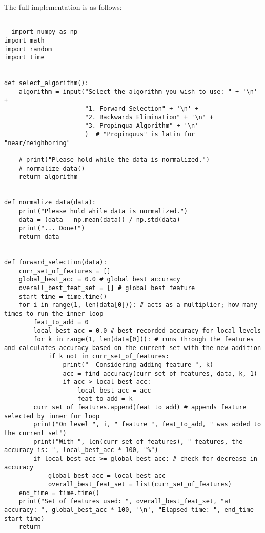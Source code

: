 \documentclass{article}
\begin{document}
\begin{lstlisting}[captionpos=b, caption=Traceback, label=listing:sparql_getallindividuals,
   basicstyle=\ttfamily]
  \end{lstlisting}


The full implementation is as follows:
\begin{lstlisting}[captionpos=b, caption=Impementation, label=listing:sparql_getallindividuals,
   basicstyle=\ttfamily]

  import numpy as np
import math
import random
import time


def select_algorithm():
    algorithm = input("Select the algorithm you wish to use: " + '\n' +
                      "1. Forward Selection" + '\n' +
                      "2. Backwards Elimination" + '\n' +
                      "3. Propinqua Algorithm" + '\n'
                      )  # "Propinquus" is latin for "near/neighboring"

    # print("Please hold while the data is normalized.")
    # normalize_data()
    return algorithm


def normalize_data(data):
    print("Please hold while data is normalized.")
    data = (data - np.mean(data)) / np.std(data)
    print("... Done!")
    return data


def forward_selection(data):
    curr_set_of_features = []
    global_best_acc = 0.0 # global best accuracy
    overall_best_feat_set = [] # global best feature
    start_time = time.time()
    for i in range(1, len(data[0])): # acts as a multiplier; how many times to run the inner loop
        feat_to_add = 0
        local_best_acc = 0.0 # best recorded accuracy for local levels
        for k in range(1, len(data[0])): # runs through the features and calculates accuracy based on the current set with the new addition
            if k not in curr_set_of_features:
                print("--Considering adding feature ", k)
                acc = find_accuracy(curr_set_of_features, data, k, 1)
                if acc > local_best_acc:
                    local_best_acc = acc
                    feat_to_add = k
        curr_set_of_features.append(feat_to_add) # appends feature selected by inner for loop
        print("On level ", i, " feature ", feat_to_add, " was added to the current set")
        print("With ", len(curr_set_of_features), " features, the accuracy is: ", local_best_acc * 100, "%")
        if local_best_acc >= global_best_acc: # check for decrease in accuracy
            global_best_acc = local_best_acc
            overall_best_feat_set = list(curr_set_of_features)
    end_time = time.time()
    print("Set of features used: ", overall_best_feat_set, "at accuracy: ", global_best_acc * 100, '\n', "Elapsed time: ", end_time - start_time)
    return



\end{lstlisting}
\end{document}
